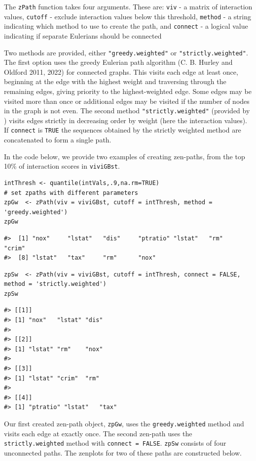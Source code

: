 The \texttt{zPath} function takes four arguments. These are:
\texttt{viv} - a matrix of interaction values,
\texttt{cutoff} - exclude interaction values below this threshold,
\texttt{method} - a string indicating which method to use to create the path, and
\texttt{connect} - a logical value indicating if separate Eulerians should be connected

Two methods are provided, either \texttt{"greedy.weighted"} or \texttt{"strictly.weighted"}. The first option uses the greedy Eulerian path algorithm (C. B. Hurley and Oldford 2011, 2022) for connected graphs. This visits each edge at least once, beginning at the edge with the highest weight and traversing through the remaining edges, giving priority to the highest-weighted edge. Some edges may be visited more than once or additional edges may be visited if the number of nodes in the graph is not even. The second method \texttt{"strictly.weighted"} (provided by ) visits edges strictly in decreasing order by weight (here the interaction values). If \texttt{connect} is \texttt{TRUE} the sequences obtained by the strictly weighted method are concatenated to form a single path.

In the code below, we provide two examples of creating zen-paths, from the top 10\% of interaction scores in \texttt{viviGBst}.

\begin{verbatim}
intThresh <- quantile(intVals,.9,na.rm=TRUE)
# set zpaths with different parameters
zpGw  <- zPath(viv = viviGBst, cutoff = intThresh, method = 'greedy.weighted')
zpGw
\end{verbatim}

\begin{verbatim}
#>  [1] "nox"     "lstat"   "dis"     "ptratio" "lstat"   "rm"      "crim"   
#>  [8] "lstat"   "tax"     "rm"      "nox"
\end{verbatim}

\begin{verbatim}
zpSw  <- zPath(viv = viviGBst, cutoff = intThresh, connect = FALSE, method = 'strictly.weighted')
zpSw
\end{verbatim}

\begin{verbatim}
#> [[1]]
#> [1] "nox"   "lstat" "dis"  
#> 
#> [[2]]
#> [1] "lstat" "rm"    "nox"  
#> 
#> [[3]]
#> [1] "lstat" "crim"  "rm"   
#> 
#> [[4]]
#> [1] "ptratio" "lstat"   "tax"
\end{verbatim}

Our first created zen-path object, \texttt{zpGw}, uses the \texttt{greedy.weighted} method and visits each edge at exactly once. The second zen-path uses the \texttt{strictly.weighted} method with \texttt{connect\ =\ FALSE}.
\texttt{zpSw} consists of four unconnected paths.
The zenplots for two of these paths are constructed below.

